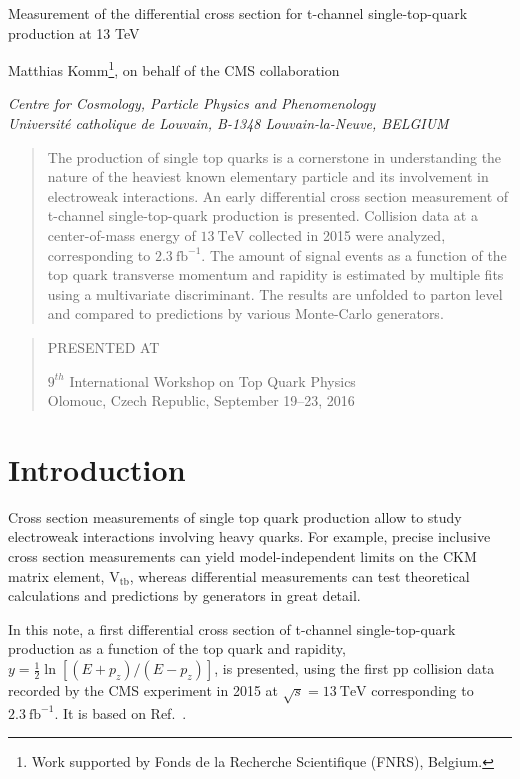 \documentclass[12pt]{article}
\newcommand\pubnumber{}%
\newcommand\pubdate{\today}
\def\institute{Centre for Cosmology, Particle Physics and Phenomenology\\
Universit\'e catholique de Louvain, B-1348 Louvain-la-Neuve, BELGIUM}
\def\support{\footnote{Work supported by Fonds de la Recherche Scientifique (FNRS), Belgium.}}
\def\Title#1{\begin{center} {\Large #1 } \end{center}}
\def\Author#1{\begin{center}{ \sc #1} \end{center}}
\def\Address#1{\begin{center}{ \it #1} \end{center}}
\newcommand\pubblock{\rightline{\begin{tabular}{l} \pubnumber\\
         \pubdate  \end{tabular}}}
\newenvironment{Abstract}{\begin{quotation}  }{\end{quotation}}
\newenvironment{Presented}{\begin{quotation} \begin{center} 
             PRESENTED AT\end{center}\bigskip 
      \begin{center}\begin{large}}{\end{large}\end{center} \end{quotation}}
\begin{document}
\begin{titlepage}
\pubblock

\vfill
\Title{Measurement of the differential cross section for t-channel single-top-quark production at 13 TeV}
\vfill
\Author{ Matthias Komm\support, on behalf of the CMS collaboration}
\Address{\institute}
\vfill
\begin{Abstract}
The production of single top quarks is a cornerstone in understanding the nature of the heaviest known elementary particle and its involvement in electroweak interactions. An early differential cross section measurement of t-channel single-top-quark production is presented. Collision data at a center-of-mass energy of $13~\mathrm{TeV}$ collected in 2015 were analyzed, corresponding to $2.3~\mathrm{fb}^{-1}$. The amount of signal events as a function of the top quark transverse momentum and rapidity is estimated by multiple fits using a multivariate discriminant. The results are unfolded to parton level and compared to predictions by various Monte-Carlo generators.
\end{Abstract}
\vfill
\begin{Presented}
$9^{th}$ International Workshop on Top Quark Physics\\
Olomouc, Czech Republic,  September 19--23, 2016
\end{Presented}
\vfill
\end{titlepage}
\def\thefootnote{\fnsymbol{footnote}}
\setcounter{footnote}{0}
%

\section{Introduction}

Cross section measurements of single top quark production allow to study electroweak interactions involving heavy quarks. For example, precise inclusive cross section measurements can yield model-independent limits on the CKM matrix element, $\mathrm{V}_\mathrm{tb}$, whereas differential measurements can test theoretical calculations and predictions by generators in great detail.

In this note, a first differential cross section of t-channel single-top-quark production as a function of the top quark \pt and rapidity, $y=\frac{1}{2}\ln[(E+p_{z})/(E-p_{z})]$, is presented, using the first pp collision data recorded by the CMS experiment in 2015 at $\sqrt{s}=13~\mathrm{TeV}$ corresponding to $2.3~\mathrm{fb}^{-1}$. It is based on Ref.~\cite{TOP-16-004}.
\end{document}
